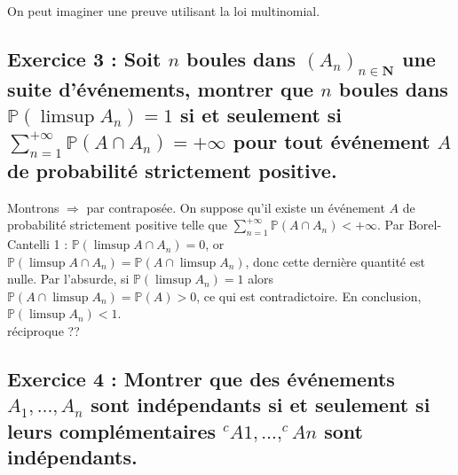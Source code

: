 \documentclass[a4paper, 10pt, oneside]{article}
\begin{document}
\begin{center}
\end{center}

\begin{rema}
On peut imaginer une preuve utilisant la loi multinomial.
\end{rema}

\subsection{Exercice 3 : Soit \texorpdfstring{$n$}{TEXT} boules dans \texorpdfstring{$(A_n)_{n\in\mathbf{N}}$}{TEXT} une suite d'événements, montrer que \texorpdfstring{$n$}{TEXT} boules dans \texorpdfstring{$\mathbb{P}(\limsup A_n)=1$}{TEXT} si et seulement si \texorpdfstring{$\sum_{n=1}^{+\infty}\mathbb{P}(A\cap A_n)=+\infty$}{TEXT} pour tout événement \texorpdfstring{$A$}{TEXT} de probabilité strictement positive.}

Montrons $\Rightarrow$ par contraposée. On suppose qu'il existe un événement $A$ de probabilité strictement positive telle que $\sum_{n=1}^{+\infty}\mathbb{P}(A\cap A_n)<+\infty$. Par Borel-Cantelli 1 : $\mathbb{P}(\limsup A\cap A_n)=0$, or $\mathbb{P}(\limsup A\cap A_n)=\mathbb{P}(A\cap\limsup A_n)$, donc cette dernière quantité est nulle. Par l'absurde, si $\mathbb{P}(\limsup A_n)=1$ alors $\mathbb{P}(A\cap \limsup A_n)=\mathbb{P}(A)>0$, ce qui est contradictoire. En conclusion, $\mathbb{P}(\limsup A_n)<1$.\\

\color{red}réciproque ??\color{black}


\subsection{Exercice 4 : Montrer que des événements \texorpdfstring{$A_1,\ldots,A_n$}{TEXT} sont indépendants si et seulement si leurs complémentaires \texorpdfstring{$^cA1,\ldots,^cAn$}{TEXT} sont indépendants.}
\end{document}

